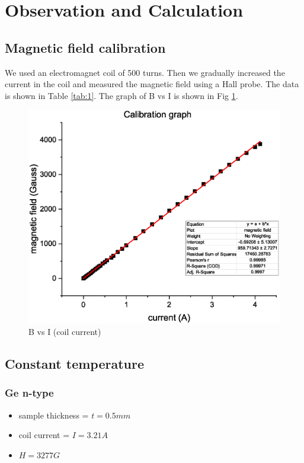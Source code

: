 \section{Observation and Calculation}

	\subsection{Magnetic field calibration}

		We used an electromagnet coil of 500 turns. Then we gradually increased the current in the coil and measured the magnetic field using a Hall probe. The data is shown in Table \ref{tab:1}. The graph of B vs I is shown in Fig \ref{graph:1}.

		
		\begin{figure}[h]
			\centering
			\includegraphics[width=0.8\columnwidth]{images/cal.eps}
			\caption{B vs I (coil current)}
			\label{graph:1}
		\end{figure}

	\subsection{Constant temperature}
		\subsubsection{Ge n-type}

			\begin{itemize}
				\item sample thickness = $t=0.5mm$
				\item coil current = $I=3.21A$
				\item $H=3277G$
			\end{itemize}

